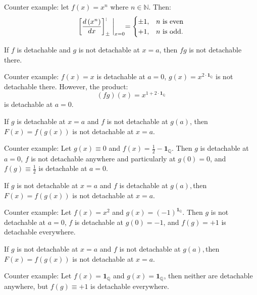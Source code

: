 \documentclass[11pt]{book}
\begin{document}
Counter example: let $f\left(x\right)=x^{n}$ where $n\in\mathbb{N}$.
Then:
\[
\left[\frac{d\left(x^{n}\right)}{dx}\right]_{\pm}^{;}\biggm\lvert_{x=0}=\begin{cases}
\pm1, & n\text{ is even}\\
+1, & n\text{ is odd}.
\end{cases}
\]

\begin{exercise}If $f$ is detachable and $g$ is not detachable at $x=a$, then
$fg$ is not detachable there.
\end{exercise}

Counter example: $f\left(x\right)=x$ is detachable at $a=0$,
$g\left(x\right)=x^{2\cdot\boldsymbol{1}_{\mathbb{Q}}}$ is not detachable
there. However, the product:
\[
\left(fg\right)\left(x\right)=x^{1+2\cdot\boldsymbol{1}_{\mathbb{Q}}}
\]
is detachable at $a=0$.

\begin{exercise}If $g$ is detachable at $x=a$ and $f$ is not detachable at
$g\left(a\right)$, then $F\left(x\right)=f\left(g\left(x\right)\right)$
is not detachable at $x=a$.
\end{exercise}

Counter example: Let $g\left(x\right)\equiv0$ and $f\left(x\right)=\frac{1}{2}-\boldsymbol{1}_{\mathbb{Q}}$.
Then $g$ is detachable at $a=0$, $f$ is not detachable anywhere
and particularly at $g\left(0\right)=0$, and $f\left(g\right)\equiv\frac{1}{2}$
is detachable at $a=0$.

\begin{exercise}If $g$ is not detachable at $x=a$ and $f$ is detachable at
$g\left(a\right),$then $F\left(x\right)=f\left(g\left(x\right)\right)$
is not detachable at $x=a$.
\end{exercise}

Counter example: Let $f\left(x\right)=x^{2}$ and $g\left(x\right)=\left(-1\right)^{\boldsymbol{1}_{\mathbb{Q}}}$.
Then $g$ is not detachable at $a=0$, $f$ is detachable at $g\left(0\right)=-1$,
and $f\left(g\right)=+1$ is detachable everywhere.

\begin{exercise}If $g$ is not detachable at $x=a$ and $f$ is not detachable
at $g\left(a\right),$then $F\left(x\right)=f\left(g\left(x\right)\right)$
is not detachable at $x=a$.
\end{exercise}

Counter example: Let $f\left(x\right)=\boldsymbol{1}_{\mathbb{Q}}$
and $g\left(x\right)=\boldsymbol{1}_{\mathbb{Q}}$, then neither are
detachable anywhere, but $f\left(g\right)\equiv+1$ is detachable
everywhere.
\end{document}
